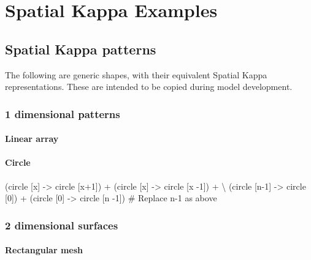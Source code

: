 \chapter{Spatial Kappa Examples}
\label{chap:resources}

\section{Spatial Kappa patterns}
\label{sec:spatialPatterns}

The following are generic shapes, with their equivalent Spatial Kappa representations. These are intended to be copied during model development.


\subsection{1 dimensional patterns}

\subsubsection{Linear array}

\begin{kappasource}
\end{kappasource}

\subsubsection{Circle}

\begin{kappasource}
    (circle [x] -> circle [x+1]) + (circle [x] -> circle [x -1]) + {\textbackslash}
    (circle [n-1] -> circle [0]) + (circle [0] -> circle [n -1]) # Replace n-1 as above
\end{kappasource}


\subsection{2 dimensional surfaces}

\subsubsection{Rectangular mesh}

